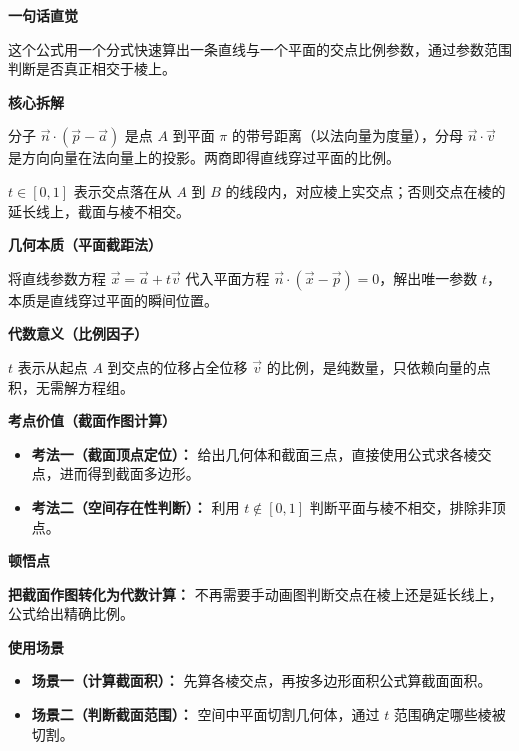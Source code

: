 \begin{explanationbox}
	\textbf{\textcolor{CExplanation}{一句话直觉}}

	\medskip
	这个公式用一个分式快速算出一条直线与一个平面的交点比例参数，通过参数范围判断是否真正相交于棱上。

	\medskip
	\textbf{\textcolor{CExplanation}{核心拆解}}
	\begin{description}[style=nextline, leftmargin=2.8em, labelsep=0.5em, itemsep=0.45em]
		\item[\textbf{要点一（交参分式结构）：}]
			分子 $\vec{n}\cdot(\vec{p}-\vec{a})$ 是点 $A$ 到平面 $\pi$ 的带号距离（以法向量为度量），分母 $\vec{n}\cdot\vec{v}$ 是方向向量在法向量上的投影。两商即得直线穿过平面的比例。
		\item[\textbf{要点二（范围确定截取）：}]
			$t\in[0,1]$ 表示交点落在从 $A$ 到 $B$ 的线段内，对应棱上实交点；否则交点在棱的延长线上，截面与棱不相交。
	\end{description}

	\medskip
	\textbf{\textcolor{CExplanation}{几何本质（平面截距法）}}

	\medskip
	将直线参数方程 $\vec{x}=\vec{a}+t\vec{v}$ 代入平面方程 $\vec{n}\cdot(\vec{x}-\vec{p})=0$，解出唯一参数 $t$，本质是直线穿过平面的瞬间位置。

	\medskip
	\textbf{\textcolor{CExplanation}{代数意义（比例因子）}}

	\medskip
	$t$ 表示从起点 $A$ 到交点的位移占全位移 $\vec{v}$ 的比例，是纯数量，只依赖向量的点积，无需解方程组。

	\medskip
	\textbf{\textcolor{CExplanation}{考点价值（截面作图计算）}}
	\begin{itemize}[leftmargin=*, itemsep=0.5em, topsep=0.4em]
		\item \textbf{考法一（截面顶点定位）：} 给出几何体和截面三点，直接使用公式求各棱交点，进而得到截面多边形。
		\item \textbf{考法二（空间存在性判断）：} 利用 $t\notin[0,1]$ 判断平面与棱不相交，排除非顶点。
	\end{itemize}

	\medskip
	\textbf{\textcolor{CExplanation}{顿悟点}}

	\medskip
	\textbf{把截面作图转化为代数计算：} 不再需要手动画图判断交点在棱上还是延长线上，公式给出精确比例。

	\medskip
	\textbf{\textcolor{CExplanation}{使用场景}}
	\begin{itemize}[leftmargin=*, itemsep=0.5em, topsep=0.4em]
		\item \textbf{场景一（计算截面积）：} 先算各棱交点，再按多边形面积公式算截面面积。
		\item \textbf{场景二（判断截面范围）：} 空间中平面切割几何体，通过 $t$ 范围确定哪些棱被切割。
	\end{itemize}

\end{explanationbox}
